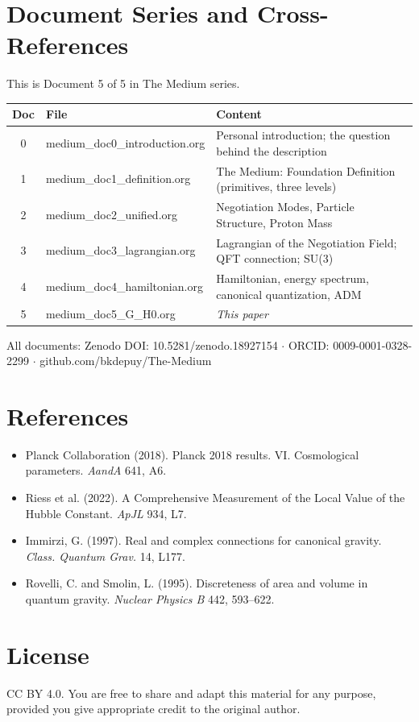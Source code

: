 \documentclass[11pt,letterpaper]{article}
\begin{document}
\section{Document Series and Cross-References}
\label{sec:org0033337}

This is Document 5 of 5 in The Medium series.

\begin{center}
\begin{tabular}{clp{9cm}}
\toprule
\textbf{Doc} & \textbf{File} & \textbf{Content}\\[0pt]
\midrule
0 & medium\_doc0\_introduction.org & Personal introduction; the question behind the description\\[0pt]
1 & medium\_doc1\_definition.org & The Medium: Foundation Definition (primitives, three levels)\\[0pt]
2 & medium\_doc2\_unified.org & Negotiation Modes, Particle Structure, Proton Mass\\[0pt]
3 & medium\_doc3\_lagrangian.org & Lagrangian of the Negotiation Field; QFT connection; SU(3)\\[0pt]
4 & medium\_doc4\_hamiltonian.org & Hamiltonian, energy spectrum, canonical quantization, ADM\\[0pt]
5 & medium\_doc5\_G\_H0.org & \emph{This paper}\\[0pt]
\bottomrule
\end{tabular}
\end{center}

All documents: Zenodo DOI: 10.5281/zenodo.18927154 \(\cdot\) ORCID: 0009-0001-0328-2299 \(\cdot\) github.com/bkdepuy/The-Medium

\section{References}
\label{sec:orgbb6f34c}

\begin{itemize}
\item Planck Collaboration (2018). Planck 2018 results. VI. Cosmological parameters. \emph{AandA} 641, A6.
\item Riess et al. (2022). A Comprehensive Measurement of the Local Value of the Hubble Constant. \emph{ApJL} 934, L7.
\item Immirzi, G. (1997). Real and complex connections for canonical gravity. \emph{Class. Quantum Grav.} 14, L177.
\item Rovelli, C. and Smolin, L. (1995). Discreteness of area and volume in quantum gravity. \emph{Nuclear Physics B} 442, 593--622.
\end{itemize}

\section{License}
\label{sec:orgb79830e}

CC BY 4.0. You are free to share and adapt this material for any purpose, provided you give appropriate credit to the original author.
\end{document}
